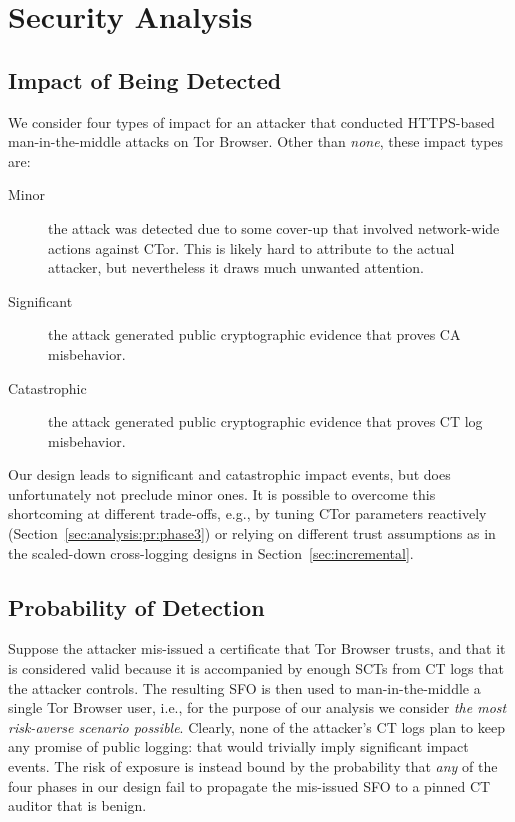 \section{Security Analysis} \label{sec:analysis}

\subsection{Impact of Being Detected} \label{sec:analysis:impact}
We consider four types of impact for an attacker that conducted
HTTPS-based man-in-the-middle attacks on Tor Browser.  Other than \emph{none},
these impact types are:
\begin{description}
	\item[Minor] the attack was detected due to some cover-up that involved
		network-wide actions against CTor.  This is likely hard to attribute to
		the actual attacker, but nevertheless it draws much unwanted attention.
	\item[Significant] the attack generated public cryptographic evidence
		that proves CA misbehavior.
	\item[Catastrophic] the attack generated public cryptographic evidence
		that proves CT log misbehavior.
\end{description}

Our design leads to significant and catastrophic impact events, but does
unfortunately not preclude minor ones.  It is possible to overcome this
shortcoming at different trade-offs, e.g., by tuning CTor parameters reactively
(Section~\ref{sec:analysis:pr:phase3}) or relying on different trust assumptions
as in the scaled-down cross-logging designs in Section~\ref{sec:incremental}.

\subsection{Probability of Detection} \label{sec:analysis:pr}
Suppose the attacker mis-issued a certificate that Tor Browser trusts, and that
it is considered valid because it is accompanied by enough SCTs from CT logs
that the attacker controls.  The resulting SFO is then used to man-in-the-middle
a single Tor Browser user, i.e., for the purpose of our analysis we consider
\emph{the most risk-averse scenario possible}.  Clearly, none of the attacker's
CT logs plan to keep any promise of public logging:
	that would trivially imply significant impact events.
The risk of exposure is instead bound by the probability that \emph{any} of the
four phases in our design fail to propagate the mis-issued SFO to a pinned CT
auditor that is benign.

